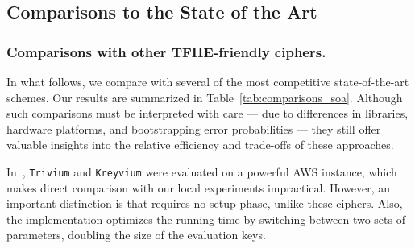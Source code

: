 \begin{table}[t!]
  \centering
  \caption{Size of the server keys for the two considered sets of parameters. 
    \label{tab:server_key_size}}
  
  \renewcommand{\arraystretch}{1.2}  %
\end{table}




\subsection{Comparisons to the State of the Art}
\label{sec:perfs_soa}	

\subsubsection{Comparisons with other \gls{TFHE}-friendly ciphers.} 
In what follows, we compare \coolName with several of the most competitive state-of-the-art schemes. Our results are summarized in Table~\ref{tab:comparisons_soa}.
Although such comparisons must be interpreted with care — due to differences in libraries, hardware platforms, and bootstrapping error probabilities — they still offer valuable insights into the relative efficiency and trade-offs of these approaches.


In~\cite{DBLP:conf/wahc/BalenboisOS23}, \texttt{Trivium} and \texttt{Kreyvium} were evaluated on a powerful AWS instance, which makes direct comparison with our local experiments impractical. However, an important distinction is that \coolName requires no setup phase, unlike these ciphers. Also, the implementation optimizes the running time by switching between two sets of parameters, doubling the size of the evaluation keys.

